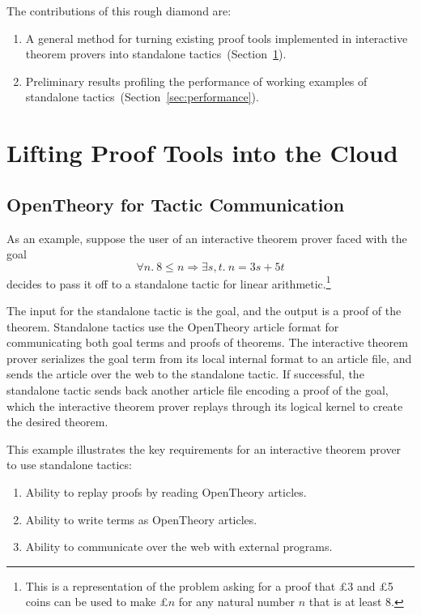 \documentclass{llncs}
\newcommand{\OpenTheory}{OpenTheory\xspace}
\newcommand{\secref}[1]{Section~\ref{sec:#1}}
\begin{document}
The contributions of this rough diamond are:
\begin{enumerate}
\item A general method for turning existing proof tools implemented in interactive theorem provers into standalone tactics~(\secref{implementation}).

\item Preliminary results profiling the performance of working examples of standalone tactics~(\secref{performance}).
\end{enumerate}

\section{Lifting Proof Tools into the Cloud}
\label{sec:implementation}

\subsection{\OpenTheory for Tactic Communication}

As an example, suppose the user of an interactive theorem prover faced with the goal
\[
\forall n.\ 8\le n\Rightarrow\exists s,t.\ n = 3s + 5t
\]
decides to pass it off to a standalone tactic for linear arithmetic.\footnote{This is a representation of the problem asking for a proof that \pounds 3 and \pounds 5 coins can be used to make \pounds $n$ for any natural number $n$ that is at least 8.}

The input for the standalone tactic is the goal, and the output is a proof of the theorem.  Standalone tactics use the \OpenTheory article format for communicating both goal terms and proofs of theorems.  The interactive theorem prover serializes the goal term from its local internal format to an article file, and sends the article over the web to the standalone tactic. If successful, the standalone tactic sends back another article file encoding a proof of the goal, which the interactive theorem prover replays through its logical kernel to create the desired theorem.

This example illustrates the key requirements for an interactive theorem prover to use standalone tactics:
\begin{enumerate}
\item\label{req:artr} Ability to replay proofs by reading \OpenTheory articles.

\item\label{req:artw} Ability to write terms as \OpenTheory articles.

\item\label{req:comm} Ability to communicate over the web with external programs.
\end{enumerate}
\end{document}
